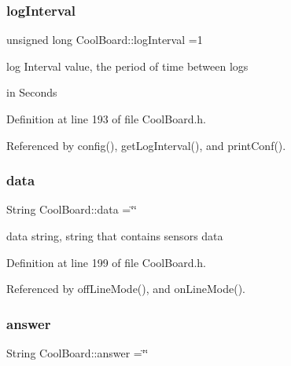 \mbox{\label{class_cool_board_a84bc94413b64973e4aba8c467c97006c}} 
\subsubsection{\texorpdfstring{log\+Interval}{logInterval}}
{\footnotesize\ttfamily unsigned long Cool\+Board\+::log\+Interval =1\hspace{0.3cm}{\ttfamily [private]}}

log Interval value, the period of time between logs
\begin{DoxyItemize}
\item in Seconds 
\end{DoxyItemize}

Definition at line 193 of file Cool\+Board.\+h.



Referenced by config(), get\+Log\+Interval(), and print\+Conf().

\mbox{\label{class_cool_board_a427fb753dd8575bdf821c70a5c63d695}} 
\subsubsection{\texorpdfstring{data}{data}}
{\footnotesize\ttfamily String Cool\+Board\+::data =\char`\"{}\char`\"{}\hspace{0.3cm}{\ttfamily [private]}}

data string, string that contains sensors data 

Definition at line 199 of file Cool\+Board.\+h.



Referenced by off\+Line\+Mode(), and on\+Line\+Mode().

\mbox{\label{class_cool_board_a7b835fafd449e5282f7f91d787a2dc15}} 
\subsubsection{\texorpdfstring{answer}{answer}}
{\footnotesize\ttfamily String Cool\+Board\+::answer =\char`\"{}\char`\"{}\hspace{0.3cm}{\ttfamily [private]}}

